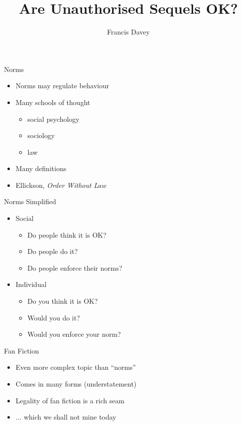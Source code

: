 \documentclass{beamer}
\title{Are Unauthorised Sequels OK?}
\author{Francis Davey}
\begin{document}
\begin{frame}
  \titlepage
\end{frame}

%
%

\begin{frame}{Norms}
  \begin{itemize}
  \item Norms may regulate behaviour
  \item Many schools of thought
    \begin{itemize}
    \item social psychology 
    \item sociology
    \item law
    \end{itemize}
  \item Many definitions
  \item Ellickson, {\it Order Without Law}
  \end{itemize}
\end{frame}

\begin{frame}{Norms Simplified}
  \begin{itemize}
  \item Social
    \begin{itemize}
    \item Do people think it is OK?
    \item Do people do it?
    \item Do people enforce their norms?
    \end{itemize}
  \item Individual
    \begin{itemize}
    \item Do you think it is OK?
    \item Would you do it?
    \item Would you enforce your norm?
    \end{itemize}
  \end{itemize}
\end{frame}

\begin{frame}{Fan Fiction}
  \begin{itemize}
  \item Even more complex topic than ``norms''
  \item Comes in many forms (understatement)
  \item Legality of fan fiction is a rich seam
  \item ... which we shall not mine today
  \end{itemize}
\end{frame}
\end{document}
